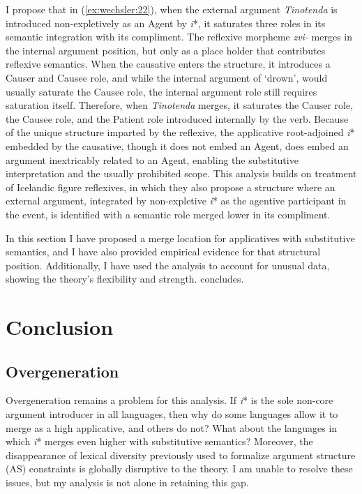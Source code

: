 \documentclass[output=paper,modfonts,nonflat,colorlinks,citecolor=brown]{langsci/langscibook}
\begin{document}
I propose that in (\ref{ex:wechsler:22}), when the external argument \textit{Tinotenda} is introduced non-expletively as an Agent by \textit{i}*, it saturates three roles in its semantic integration with its compliment. The reflexive morpheme \textit{zvi-} merges in the internal argument position, but only as a place holder that contributes reflexive semantics. When the causative enters the structure, it introduces a Causer and Causee role, and while the internal argument of ‘drown’, would usually saturate the Causee role, the internal argument role still requires saturation itself. Therefore, when \textit{Tinotenda} merges, it saturates the Causer role, the Causee role, and the Patient role introduced internally by the verb. Because of the unique structure imparted by the reflexive, the applicative root-adjoined \textit{i}* embedded by the causative, though it does not embed an Agent, does embed an argument inextricably related to an Agent, enabling the substitutive interpretation and the usually prohibited scope. This analysis builds on  treatment of Icelandic figure reflexives, in which they also propose a structure where an external argument, integrated by non-expletive \textit{i}* as the agentive participant in the event, is identified with a semantic role merged lower in its compliment.


In this section I have proposed a merge location for applicatives with substitutive semantics, and I have also provided empirical evidence for that structural position. Additionally, I have used the analysis to account for unusual data, showing the theory’s flexibility and strength.  concludes.

\section{Conclusion}\label{sec:wechsler:4}

\subsection{Overgeneration}\label{sec:wechsler:4.1}

Overgeneration remains a problem for this analysis. If \textit{i}* is the sole non-core argument introducer in all languages, then why do some languages allow it to merge as a high applicative, and others do not? What about the languages in which \textit{i}* merges even higher with substitutive semantics? Moreover, the disappearance of lexical diversity previously used to formalize argument structure (AS) constraints is globally disruptive to the theory. I am unable to resolve these issues, but my analysis is not alone in retaining this gap.
\end{document}

